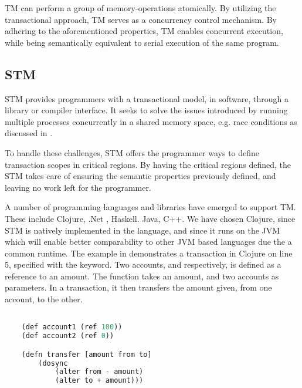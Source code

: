 \ac{TM} can perform a group of memory-operations atomically\cite[48]{harris2005composable}. By utilizing the transactional approach, \ac{TM} serves as a concurrency control mechanism. By adhering to the aforementioned properties, \ac{TM} enables concurrent execution, while being semantically equivalent to serial execution of the same program.

\subsection{\acl{STM}}
\ac{STM} provides programmers with a transactional model, in software, through a library or compiler interface\cite{herlihy2011tm}. It seeks to solve the issues introduced by running multiple processes concurrently in a shared memory space, e.g. race conditions as discussed in . 

To handle these challenges, \ac{STM} offers the programmer ways to define transaction scopes in critical regions. By having the critical regions defined, the \ac{STM} takes care of ensuring the semantic properties previously defined, and leaving no work left for the programmer.

A number of programming languages and libraries have emerged to support TM. These include Clojure, .Net , Haskell. Java, C++. We have chosen Clojure, since \ac{STM} is natively implemented in the language, and since it runs on the \ac{JVM} which will enable better comparability to other \ac{JVM} based languages due the a common runtime. The example in  demonstrates a transaction in Clojure on line 5, specified with the  keyword. Two accounts,  and  respectively, is defined as a reference to an amount. The function  takes an amount, and two accounts as parameters. In a transaction, it then transfers the amount given, from one account, to the other.

\begin{lstlisting}[label=lst:stmexample,
  caption={STM in Clojure},
  language=Lisp,  
  showspaces=false,
  showtabs=false,
  breaklines=true,
  showstringspaces=false,
  breakatwhitespace=true,
  commentstyle=\color{greencomments},
  keywordstyle=\color{bluekeywords},
  stringstyle=\color{redstrings}]  % Start your code-block

	(def account1 (ref 100))
	(def account2 (ref 0))

	(defn transfer [amount from to]
    	(dosync
    		(alter from - amount)
    		(alter to + amount)))
       
\end{lstlisting}

